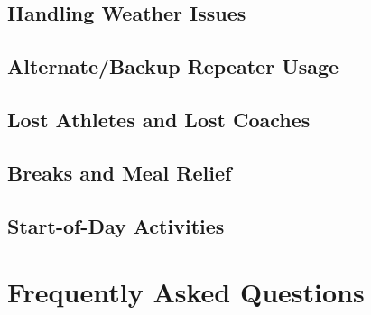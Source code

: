 \documentclass[pdflatex,letterpaper,twoside,12pt]{book}
\begin{document}
\section{Handling Weather Issues}

\iffalse %
 * Clearly define process or criteria in which we begin collecting or
   disseminating weather data? 
\fi %


\section{Alternate/Backup Repeater Usage}


\section{Lost Athletes and Lost Coaches}


\section{Breaks and Meal Relief}

\iffalse %
Director will now be responsible for getting meals to the net control folks, 
this worked perfect this time!
\fi %


\section{Start-of-Day Activities}

\iffalse %
 * Need notice for security to charge radios at night
     o Send a reminder voice communication Friday and Saturday Evenings
       (Logistics Control) 
\fi %


\chapter{Frequently Asked Questions}

\iffalse %
 * Need to develop a FAQ - Net control runs event, Do Not Call 911,
   Don't know? Ask Net control, etc... Get food, and stay hydrated! 3rd
   party traffic is allowed - know when to hand the radio to that person! 
\fi %
\end{document}
